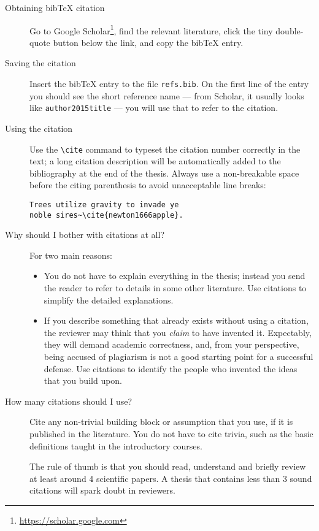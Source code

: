 \begin{description}
\item[Obtaining bibTeX citation] Go to Google Scholar\footnote{\url{https://scholar.google.com}}, find the relevant literature, click the tiny double-quote button below the link, and copy the bibTeX entry.
\item[Saving the citation] Insert the bibTeX entry to the file \texttt{refs.bib}. On the first line of the entry you should see the short reference name --- from Scholar, it usually looks like \texttt{author2015title} --- you will use that to refer to the citation.
\item[Using the citation] Use the \verb|\cite| command to typeset the citation number correctly in the text; a long citation description will be automatically added to the bibliography at the end of the thesis. Always use a non-breakable space before the citing parenthesis to avoid unacceptable line breaks:
\begin{Verbatim}
Trees utilize gravity to invade ye
noble sires~\cite{newton1666apple}.
\end{Verbatim}
\item[Why should I bother with citations at all?] For two main reasons:
\begin{itemize}
\item You do not have to explain everything in the thesis; instead you send the reader to refer to details in some other literature. Use citations to simplify the detailed explanations.
\item If you describe something that already exists without using a citation, the reviewer may think that you \emph{claim} to have invented it. Expectably, they will demand academic correctness, and, from your perspective, being accused of plagiarism is not a good starting point for a successful defense. Use citations to identify the people who invented the ideas that you build upon.
\end{itemize}
\item[How many citations should I use?]
Cite any non-trivial building block or assumption that you use, if it is published in the literature. You do not have to cite trivia, such as the basic definitions taught in the introductory courses.

The rule of thumb is that you should read, understand and briefly review at least around 4 scientific papers. A thesis that contains less than 3 sound citations will spark doubt in reviewers.
\end{description}

